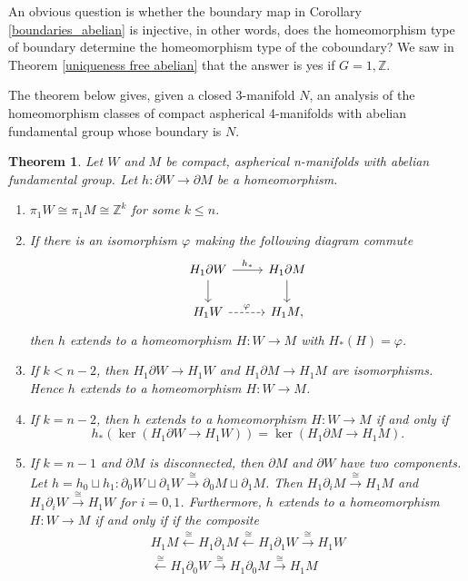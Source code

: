 \documentclass[12pt]{amsart}
\newtheorem{theorem}{Theorem}
\theoremstyle{definition}
\newcommand{\Z}{\mathbb Z}
\begin{document}
An obvious question is whether the boundary map in Corollary \ref{boundaries_abelian} is injective, in other words, does the homeomorphism type of boundary determine the homeomorphism type of the coboundary?
We saw in Theorem \ref{uniqueness free abelian}  that the answer is yes if $G = 1, \Z$.

The theorem below gives, given a closed 3-manifold $N$, an analysis of the homeomorphism classes of compact aspherical 4-manifolds with abelian fundamental group whose boundary is $N$.

\begin{theorem} \label{summary}
Let $W$ and $M$ be compact, aspherical n-manifolds with abelian fundamental group.   Let $h : \partial W \to \partial M$ be a homeomorphism.
\begin{enumerate}
\item $\pi_1W \cong \pi_1M \cong \Z^k$ for some $k \leq n$.
 \item  If there is an isomorphism $\varphi$ making the following diagram commute
\[
\begin{tikzcd}
H_1\partial W \arrow[r,"h_*"]  \arrow[d] &  H_1\partial M  \arrow[d] \\
H_1W \arrow[r,dashed,"\varphi"] &  H_1 M,
\end{tikzcd}
\]
then $h$ extends to a homeomorphism $H : W \to M$ with $H_*(H) = \varphi$.
 \item If $k < n-2$, then $H_1\partial W \to H_1W$  and $H_1\partial M \to H_1M$ are isomorphisms. 
Hence $h$ extends to a homeomorphism $H : W \to M$.
\item If $k = n-2$, then $h$ extends to a homeomorphism $H : W \to M$ if and only if 
\[
h_*(\ker (H_1\partial W \to H_1W) )= \ker (H_1\partial M \to H_1M).
\]
\item If $k = n-1$ and $\partial M$ is disconnected, then $\partial M$ and $\partial W$ have two components.    Let $h = h_0 \sqcup h_1 : \partial_0 W \sqcup \partial_1 W \xrightarrow{\cong} \partial_0 M \sqcup \partial_1 M$.   Then $H_1\partial_i M  \xrightarrow{\cong}  H_1M$ and $H_1\partial_i W  \xrightarrow{\cong}  H_1W$ for $i = 0,1$.
Furthermore, $h$ extends to a homeomorphism $H : W \to M$ if and only if if the composite 
\begin{multline*}
 H_1 M \xleftarrow{\cong}  H_1\partial_1 M \xleftarrow{\cong}  H_1\partial_1 W \xrightarrow{\cong} H_1 W \\ \xleftarrow{\cong}  H_1\partial_0 W \xrightarrow{\cong}  H_1\partial_0 M  \xrightarrow{\cong} H_1 M 
\end{multline*}

\end{enumerate}
\end{theorem}
\end{document}

